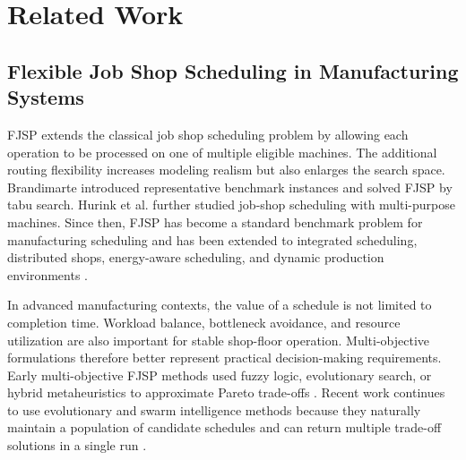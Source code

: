\documentclass[pdflatex,iicol,Numbered,sn-basic]{sn-jnl}
\begin{document}
\section{Related Work}\label{sec:literature}

\subsection{Flexible Job Shop Scheduling in Manufacturing Systems}\label{subsec:fjsp_lit}

FJSP extends the classical job shop scheduling problem by allowing each operation to be processed on one of multiple eligible machines. The additional routing flexibility increases modeling realism but also enlarges the search space.
Brandimarte \cite{brandimarte1993routing} introduced representative benchmark instances and solved FJSP by tabu search. Hurink et al. \cite{hurink1994tabu} further studied job-shop scheduling with multi-purpose machines.
Since then, FJSP has become a standard benchmark problem for manufacturing scheduling and has been extended to integrated scheduling, distributed shops, energy-aware scheduling, and dynamic production environments \cite{li2022survey}.

In advanced manufacturing contexts, the value of a schedule is not limited to completion time. Workload balance, bottleneck avoidance, and resource utilization are also important for stable shop-floor operation.
Multi-objective formulations therefore better represent practical decision-making requirements. Early multi-objective FJSP methods used fuzzy logic, evolutionary search, or hybrid metaheuristics to approximate Pareto trade-offs \cite{kacem2002pareto}.
Recent work continues to use evolutionary and swarm intelligence methods because they naturally maintain a population of candidate schedules and can return multiple trade-off solutions in a single run \cite{gao2019review,zhang2024cooperative}.
\end{document}
